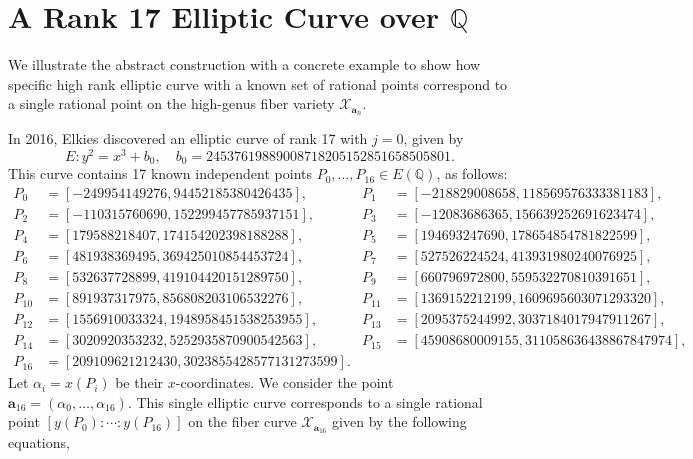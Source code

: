 \documentclass[11pt, a4paper]{amsart}
\theoremstyle{definition}
\newcommand{\Q}{\mathbb{Q}}
\newcommand{\Xc}{\mathcal{X}}
\newcommand{\ba}{\mathbf{a}}
\begin{document}
\section{A Rank 17 Elliptic Curve over $\Q$}
\label{examples}
We illustrate the abstract construction with a concrete example to show how specific high rank elliptic curve  with a known set of rational points correspond to a single rational point on the high-genus fiber variety $\Xc_{\ba_n}$.



In 2016, Elkies discovered an elliptic curve of rank 17 with $j=0$, given by
\[ E: y^2 = x^3 + b_0, \quad b_0 = 24537619889008718205152851658505801. \]
This curve contains 17 known independent points $P_0, \dots, P_{16} \in E(\Q)$, as follows:	
{\small
	\begin{align*}
		P_0   & =  [-249954149276, 94452185380426435],    & P_1  & =  [-218829008658, 118569576333381183],           \\
		P_2   & =  [-110315760690, 152299457785937151],   & P_3  & =  [-12083686365, 156639252691623474],            \\
		P_4   & =  [179588218407, 174154202398188288],    & P_5  & =  [194693247690, 178654854781822599],            \\
		P_6   & =  [481938369495, 369425010854453724],    & P_7  & =  [527526224524, 413931980240076925],           \\
		P_8   & =  [532637728899, 419104420151289750],    & P_9  & =  [660796972800, 559532270810391651],           \\
		P_{10} & =  [891937317975, 856808203106532276],   & P_{11} & =  [1369152212199, 1609695603071293320],     \\
		P_{12} & =  [1556910033324, 1948958451538253955], & P_{13} & =  [2095375244992, 3037184017947911267],    \\
		P_{14} & =  [3020920353232, 5252935870900542563], & P_{15} & =  [45908680009155, 311058636438867847974],  \\ 
		P_{16} & =  [209109621212430, 3023855428577131273599].   
\end{align*}}
Let $\alpha_i = x(P_i)$ be their $x$-coordinates. We consider the point $\ba_{16} = (\alpha_0, \dots, \alpha_{16})$. This single elliptic curve corresponds to a single rational point
$[y(P_0): \cdots : y(P_{16})]$ 
on the fiber curve $\Xc_{\ba_{16}}$ given by
the following equations,
\end{document}
